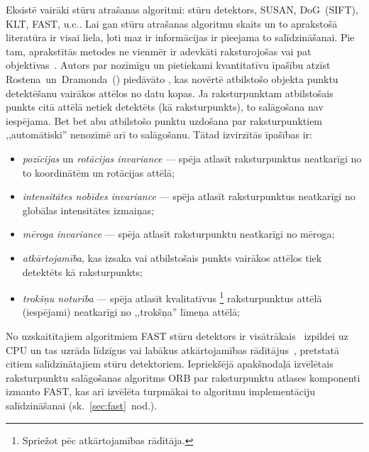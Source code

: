 Eksistē vairāki stūru atrašanas algoritmi:  stūru detektors,
SUSAN, DoG~(SIFT), KLT, FAST, u.c.. 
Lai gan stūru atrašanas algoritmu skaits un to aprakstošā literatūra ir
visai liela, ļoti maz ir informācijas ir pieejama to salīdzināšanai. Pie
tam, aprakstītās metodes ne vienmēr ir adevkāti raksturojošas vai pat
objektīvas~\cite{Mokhtarian}\cite{FAST}. Autors par nozīmīgu un 
pietiekami kvantitatīvu īpašību atzīst 
Rostena~un~Dramonda\cite{FAST}~() piedāvāto
, kas novērtē atbilstošo objekta punktu detektēšanu
vairākos attēlos no datu kopas. Ja raksturpunktam atbilstošais punkts
citā attēlā netiek detektēts (kā raksturpunkts),
to salāgošana nav iespējama.
Bet bet abu atbilstošo punktu uzdošana par raksturpunktiem ,,automātiski''
nenozīmē arī to salāgošanu.
Tātad izvirzītās īpašības ir:
\begin{itemize}
	\item \emph{pozīcijas} un \emph{rotācijas invariance} --- spēja atlasīt
		raksturpunktus neatkarīgi no to koordinātēm un rotācijas attēlā;
	\item \emph{intensitātes nobīdes invariance} --- spēja atlasīt
		raksturpunktus neatkarīgi no globālas intensitātes izmaiņas;
	\item \emph{mēroga invariance} --- spēja atlasīt raksturpunktu
		neatkarīgi no mēroga;
	\item \emph{atkārtojamība}, kas izsaka vai atbilstošais punkts vairākos
		attēlos tiek detektēts kā raksturpunkts;
	\item \emph{trokšņu noturība} --- spēja atlasīt kvalitatīvus%
			\footnote{Spriežot pēc atkārtojamības rādītāja.}
		raksturpunktus attēlā (iespējami) neatkarīgi no ,,trokšņa'' līmeņa attēlā;
\end{itemize}

No uzskaitītajiem algoritmiem FAST stūru detektors ir
visātrākais~\cite{Rosten-tracking}\cite{FAST} izpildei uz CPU un
tas uzrāda līdzīgus vai labākus atkārtojamības rādītājus~\cite{FAST},
pretstatā citiem salīdzinātajiem stūru detektoriem. Iepriekšējā apakšnodaļā
izvēlētais raksturpunktu salāgošanas algoritms ORB par raksturpunktu atlases
komponenti izmanto FAST, kas arī izvēlēta
turpmākai to algoritmu implementāciju salīdzināšanai
(sk.~\ref{sec:fast}~nod.).

